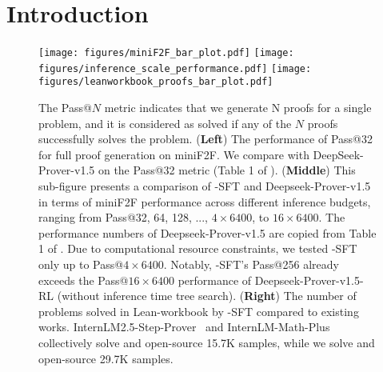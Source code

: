 \section{Introduction}

\begin{figure}[h]
    \centering
\texttt{[image: figures/miniF2F\_bar\_plot.pdf]}
\texttt{[image: figures/inference\_scale\_performance.pdf]}
\texttt{[image: figures/leanworkbook\_proofs\_bar\_plot.pdf]}
    \caption{
    The Pass@$N$ metric indicates that we generate N proofs for a single problem, and it is considered as solved if any of the $N$ proofs successfully solves the problem. (\textbf{Left}) The performance of Pass@32 for full proof generation on miniF2F. We compare with DeepSeek-Prover-v1.5 on the Pass@32 metric (Table 1 of \cite{xin2024deepseekv15}).    (\textbf{Middle}) This sub-figure presents a comparison of \prover-SFT and Deepseek-Prover-v1.5 in terms of miniF2F performance across different inference budgets, ranging from Pass@32, 64, 128, ..., $4 \times 6400$, to $16 \times 6400$. The performance numbers of Deepseek-Prover-v1.5 are copied from Table 1 of \cite{xin2024deepseekv15}. Due to computational resource constraints, we tested \prover-SFT only up to Pass@$4\times6400$. Notably, \prover-SFT's Pass@256 already exceeds the Pass@$16\times6400$ performance of Deepseek-Prover-v1.5-RL (without inference time tree search).  (\textbf{Right}) The number of problems solved in Lean-workbook by \prover-SFT compared to existing works. InternLM2.5-Step-Prover~\citep{wu2024internlm2} and InternLM-Math-Plus~\citep{ying2024internlm} collectively solve and open-source 15.7K samples, while we solve and open-source 29.7K samples.} %
    \label{fig:main_Results}
\end{figure}

